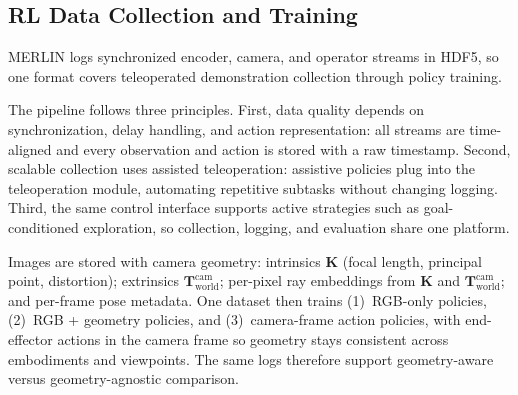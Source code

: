 \documentclass[a4paper, 10pt, conference]{ieeeconf}      %
\begin{document}

\subsection{RL Data Collection and Training}
MERLIN logs synchronized encoder, camera, and operator streams in HDF5, so one format covers teleoperated demonstration collection through policy training.

The pipeline follows three principles. First, data quality depends on synchronization, delay handling, and action representation: all streams are time-aligned and every observation and action is stored with a raw timestamp. Second, scalable collection uses assisted teleoperation: assistive policies plug into the teleoperation module, automating repetitive subtasks without changing logging. Third, the same control interface supports active strategies such as goal-conditioned exploration, so collection, logging, and evaluation share one platform.

Images are stored with camera geometry: intrinsics \(\bm{K}\) (focal length, principal point, distortion); extrinsics \(\bm{T}_{\text{world}}^{\text{cam}}\); per-pixel ray embeddings from \(\bm{K}\) and \(\bm{T}_{\text{world}}^{\text{cam}}\); and per-frame pose metadata. One dataset then trains (1)~RGB-only policies, (2)~RGB + geometry policies, and (3)~camera-frame action policies, with end-effector actions in the camera frame so geometry stays consistent across embodiments and viewpoints. The same logs therefore support geometry-aware versus geometry-agnostic comparison.


\end{document}

